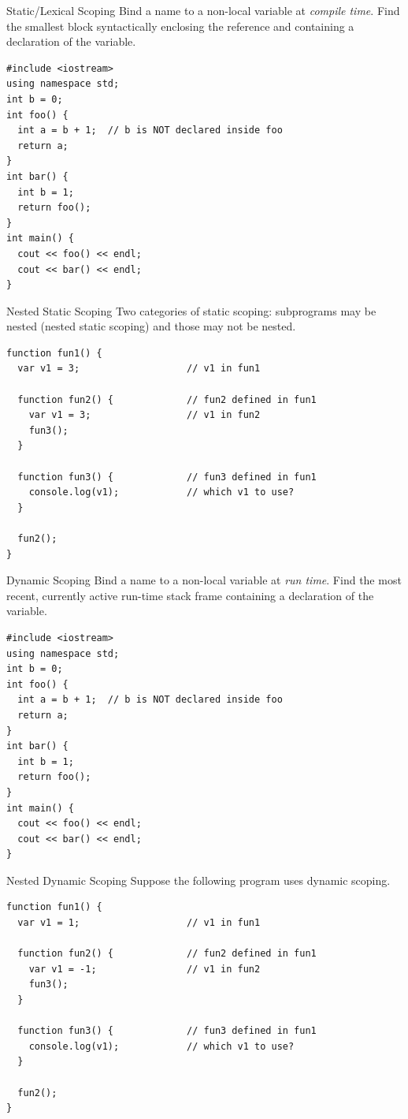 \documentclass[presentation]{beamer}
\begin{document}
\begin{frame}[fragile,label={sec:orgheadline30}]{Static/Lexical Scoping}
 Bind a name to a non-local variable at \emph{compile time}.  Find the
smallest block syntactically enclosing the reference and containing
a declaration of the variable.

\begin{verbatim}
#include <iostream>
using namespace std;
int b = 0;
int foo() {
  int a = b + 1;  // b is NOT declared inside foo
  return a;
}
int bar() {
  int b = 1;
  return foo();
}
int main() {
  cout << foo() << endl;
  cout << bar() << endl;
}
\end{verbatim}
\end{frame}

\begin{frame}[fragile,label={sec:orgheadline31}]{Nested Static Scoping}
 Two categories of static scoping: subprograms may be nested (nested
static scoping) and those may not be nested.

\begin{verbatim}
function fun1() {
  var v1 = 3;                   // v1 in fun1

  function fun2() {             // fun2 defined in fun1
    var v1 = 3;                 // v1 in fun2
    fun3();
  }

  function fun3() {             // fun3 defined in fun1
    console.log(v1);            // which v1 to use?
  }

  fun2();
}
\end{verbatim}
\end{frame}

\begin{frame}[fragile,label={sec:orgheadline32}]{Dynamic Scoping}
 Bind a name to a non-local variable at \emph{run time}.  Find the most
recent, currently active run-time stack frame containing a
declaration of the variable.

\begin{verbatim}
#include <iostream>
using namespace std;
int b = 0;
int foo() {
  int a = b + 1;  // b is NOT declared inside foo
  return a;
}
int bar() {
  int b = 1;
  return foo();
}
int main() {
  cout << foo() << endl;
  cout << bar() << endl;
}
\end{verbatim}
\end{frame}

\begin{frame}[fragile,label={sec:orgheadline33}]{Nested Dynamic Scoping}
 Suppose the following program uses dynamic scoping.

\begin{verbatim}
function fun1() {
  var v1 = 1;                   // v1 in fun1

  function fun2() {             // fun2 defined in fun1
    var v1 = -1;                // v1 in fun2
    fun3();
  }

  function fun3() {             // fun3 defined in fun1
    console.log(v1);            // which v1 to use?
  }

  fun2();
}
\end{verbatim}
\end{frame}
\end{document}
